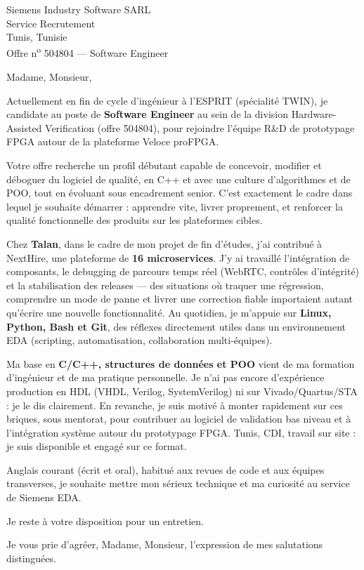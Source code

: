 \documentclass[11pt,a4paper]{letter}
\date{\today}
\begin{document}
\begin{letter}{%
  Siemens Industry Software SARL\\
  Service Recrutement\\
  Tunis, Tunisie\\
  Offre n\textsuperscript{o} 504804 — Software Engineer%
}

\opening{Madame, Monsieur,}

Actuellement en fin de cycle d'ingénieur à l'ESPRIT (spécialité TWIN), je candidate au poste de \textbf{Software Engineer} au sein de la division Hardware-Assisted Verification (offre 504804), pour rejoindre l'équipe R\&D de prototypage FPGA autour de la plateforme Veloce proFPGA.

Votre offre recherche un profil débutant capable de concevoir, modifier et déboguer du logiciel de qualité, en C++ et avec une culture d'algorithmes et de POO, tout en évoluant sous encadrement senior. C'est exactement le cadre dans lequel je souhaite démarrer : apprendre vite, livrer proprement, et renforcer la qualité fonctionnelle des produits sur les plateformes cibles.

Chez \textbf{Talan}, dans le cadre de mon projet de fin d'études, j'ai contribué à NextHire, une plateforme de \textbf{16 microservices}. J'y ai travaillé l'intégration de composants, le debugging de parcours temps réel (WebRTC, contrôles d'intégrité) et la stabilisation des releases — des situations où traquer une régression, comprendre un mode de panne et livrer une correction fiable importaient autant qu'écrire une nouvelle fonctionnalité. Au quotidien, je m'appuie sur \textbf{Linux, Python, Bash et Git}, des réflexes directement utiles dans un environnement EDA (scripting, automatisation, collaboration multi-équipes).

Ma base en \textbf{C/C++, structures de données et POO} vient de ma formation d'ingénieur et de ma pratique personnelle. Je n'ai pas encore d'expérience production en HDL (VHDL, Verilog, SystemVerilog) ni sur Vivado/Quartus/STA : je le dis clairement. En revanche, je suis motivé à monter rapidement sur ces briques, sous mentorat, pour contribuer au logiciel de validation bas niveau et à l'intégration système autour du prototypage FPGA. Tunis, CDI, travail sur site : je suis disponible et engagé sur ce format.

Anglais courant (écrit et oral), habitué aux revues de code et aux équipes transverses, je souhaite mettre mon sérieux technique et ma curiosité au service de Siemens EDA.

Je reste à votre disposition pour un entretien.

\vspace{0.5em}
\closing{Je vous prie d'agréer, Madame, Monsieur, l'expression de mes salutations distinguées.}

\end{letter}
\end{document}
